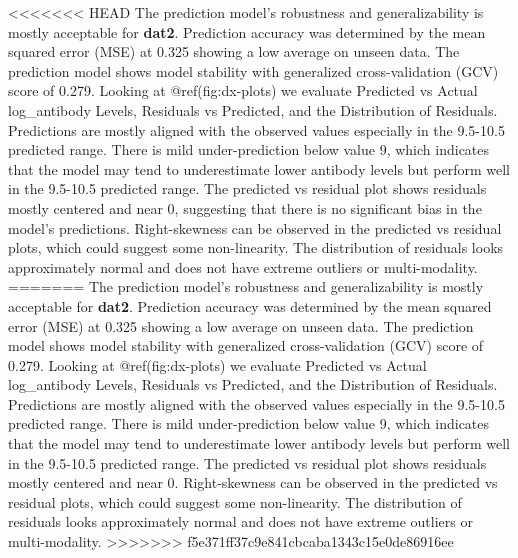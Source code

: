 \documentclass[
]{article}
\begin{document}
\textless\textless\textless\textless\textless\textless\textless{} HEAD
The prediction model's robustness and generalizability is mostly
acceptable for \textbf{dat2}. Prediction accuracy was determined by the
mean squared error (MSE) at 0.325 showing a low average on unseen data.
The prediction model shows model stability with generalized
cross-validation (GCV) score of 0.279. Looking at @ref(fig:dx-plots) we
evaluate Predicted vs Actual log\_antibody Levels, Residuals vs
Predicted, and the Distribution of Residuals. Predictions are mostly
aligned with the observed values especially in the 9.5-10.5 predicted
range. There is mild under-prediction below value 9, which indicates
that the model may tend to underestimate lower antibody levels but
perform well in the 9.5-10.5 predicted range. The predicted vs residual
plot shows residuals mostly centered and near 0, suggesting that there
is no significant bias in the model's predictions. Right-skewness can be
observed in the predicted vs residual plots, which could suggest some
non-linearity. The distribution of residuals looks approximately normal
and does not have extreme outliers or multi-modality. ======= The
prediction model's robustness and generalizability is mostly acceptable
for \textbf{dat2}. Prediction accuracy was determined by the mean
squared error (MSE) at 0.325 showing a low average on unseen data. The
prediction model shows model stability with generalized cross-validation
(GCV) score of 0.279. Looking at @ref(fig:dx-plots) we evaluate
Predicted vs Actual log\_antibody Levels, Residuals vs Predicted, and
the Distribution of Residuals. Predictions are mostly aligned with the
observed values especially in the 9.5-10.5 predicted range. There is
mild under-prediction below value 9, which indicates that the model may
tend to underestimate lower antibody levels but perform well in the
9.5-10.5 predicted range. The predicted vs residual plot shows residuals
mostly centered and near 0. Right-skewness can be observed in the
predicted vs residual plots, which could suggest some non-linearity. The
distribution of residuals looks approximately normal and does not have
extreme outliers or multi-modality.
\textgreater\textgreater\textgreater\textgreater\textgreater\textgreater\textgreater{}
f5e371ff37c9e841cbcaba1343c15e0de86916ee
\end{document}
